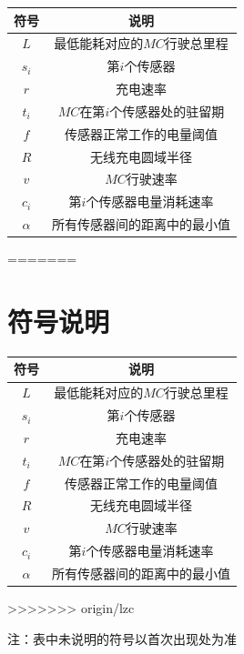 \documentclass{whutmod}
\begin{document}
		\begin{table}[H]
		\centering
		\setlength{\tabcolsep}{12mm}
		\begin{tabular}{cc}
			\toprule[1.5pt]
			\multicolumn{1}{m{5cm}}{\centering 符号} & \multicolumn{1}{m{5cm}}{\centering 说明} \\
			\midrule[1pt]		
			$L$  & 最低能耗对应的$MC$行驶总里程  \\ 
			$s_i$  & 第$i$个传感器  \\ 
		   	$r$  & 充电速率  \\ 
		   	$t_i$  & $MC$在第$i$个传感器处的驻留期  \\ 
		   	$f$  & 传感器正常工作的电量阈值  \\ 
		   	$R$  & 无线充电圆域半径  \\ 
		   	$v$  & $MC$行驶速率  \\ 
		   	$c_i$  & 第$i$个传感器电量消耗速率  \\ 
		   	$\alpha$  & 所有传感器间的距离中的最小值  \\ 
			\bottomrule[1.5pt]
		\end{tabular}
		\begin{tablenotes}
=======
\section{符号说明}
\begin{table}[H]
	\centering
	\setlength{\tabcolsep}{12mm}
	\begin{tabular}{cc}
		\toprule[1.5pt]
		\multicolumn{1}{m{5cm}}{\centering 符号} & \multicolumn{1}{m{5cm}}{\centering 说明} \\
		\midrule[1pt]		
		$L$  & 最低能耗对应的$MC$行驶总里程  \\ 
		$s_i$  & 第$i$个传感器  \\ 
		$r$  & 充电速率  \\ 
		$t_i$  & $MC$在第$i$个传感器处的驻留期  \\ 
		$f$  & 传感器正常工作的电量阈值  \\ 
		$R$  & 无线充电圆域半径  \\ 
		$v$  & $MC$行驶速率  \\ 
		$c_i$  & 第$i$个传感器电量消耗速率  \\ 
		$\alpha$  & 所有传感器间的距离中的最小值  \\ 
		\bottomrule[1.5pt]
	\end{tabular}
	\begin{tablenotes}
>>>>>>> origin/lzc
		\item 注：表中未说明的符号以首次出现处为准
	\end{tablenotes}
\end{table}


\end{tablenotes}
\end{table}
\end{document}
